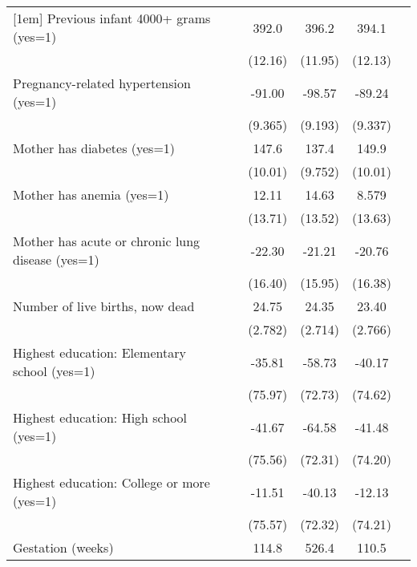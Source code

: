 \begin{tabular}{l*{5}{c}}
[1em]
Previous infant 4000+ grams (yes=1)&            &       392.0&       396.2&       394.1&            \\
                    &            &     (12.16)&     (11.95)&     (12.13)&            \\
[1em]
Pregnancy-related hypertension (yes=1)&            &      -91.00&      -98.57&      -89.24&            \\
                    &            &     (9.365)&     (9.193)&     (9.337)&            \\
[1em]
Mother has diabetes (yes=1)&            &       147.6&       137.4&       149.9&            \\
                    &            &     (10.01)&     (9.752)&     (10.01)&            \\
[1em]
Mother has anemia (yes=1)&            &       12.11&       14.63&       8.579&            \\
                    &            &     (13.71)&     (13.52)&     (13.63)&            \\
[1em]
Mother has acute or chronic lung disease (yes=1)&            &      -22.30&      -21.21&      -20.76&            \\
                    &            &     (16.40)&     (15.95)&     (16.38)&            \\
[1em]
Number of live births, now dead&            &       24.75&       24.35&       23.40&            \\
                    &            &     (2.782)&     (2.714)&     (2.766)&            \\
[1em]
Highest education: Elementary school (yes=1)&            &      -35.81&      -58.73&      -40.17&            \\
                    &            &     (75.97)&     (72.73)&     (74.62)&            \\
[1em]
Highest education: High school (yes=1)&            &      -41.67&      -64.58&      -41.48&            \\
                    &            &     (75.56)&     (72.31)&     (74.20)&            \\
[1em]
Highest education: College or more (yes=1)&            &      -11.51&      -40.13&      -12.13&            \\
                    &            &     (75.57)&     (72.32)&     (74.21)&            \\
[1em]
Gestation (weeks)   &            &       114.8&       526.4&       110.5&            \\

\end{tabular}
